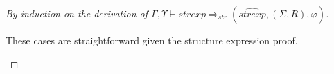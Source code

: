 \begin{proof}[By induction on the derivation of $\Gamma,\Upsilon\vdash
  strexp \Rightarrow_{str} (\widehat{strexp}, (\Sigma,R),\varphi)$]
\begin{description}
\begin{description}


 
\end{description}
\item[Module declarations] These cases are straightforward given the structure
  expression proof. 
\end{description}
\end{proof}





